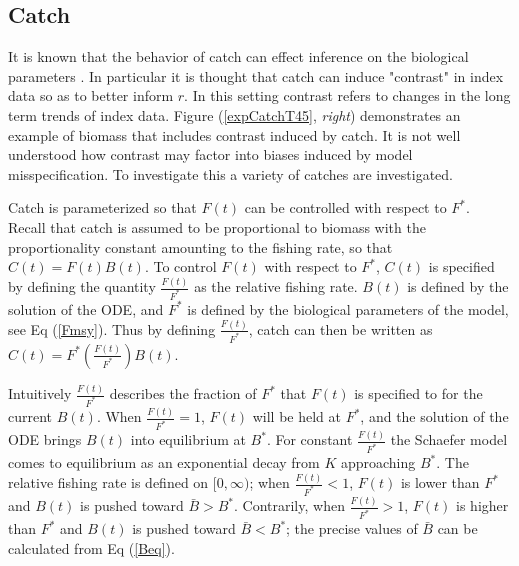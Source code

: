 \documentclass[12pt]{article}
\begin{document}
{%
\clearpage
\subsection{Catch \label{catch}}


%
It is known that the behavior of catch can effect inference on the biological 
parameters . %
In particular it is thought that catch can induce "contrast" in index data
so as to better inform $r$. In this setting contrast refers to changes in the 
long term trends of index data. Figure (\ref{expCatchT45}, \emph{right}) demonstrates an 
example of biomass that includes contrast induced by catch. It is not well 
understood how contrast may factor into biases induced by model misspecification. 
To investigate this a variety of catches are investigated.

%
Catch is parameterized so that $F(t)$ can be controlled with respect to $F^*$. 
Recall that catch is assumed to be proportional to biomass with the 
proportionality constant amounting to the fishing rate, so that $C(t)=F(t)B(t)$. 
To control $F(t)$ with respect to $F^*$, $C(t)$ is specified by defining the 
quantity $\frac{F(t)}{F^*}$ as the relative fishing rate. $B(t)$ is defined 
by the solution of the ODE, and $F^*$ is defined by the biological parameters 
of the model, see Eq (\ref{Fmsy}).  Thus by defining 
$\frac{F(t)}{F^*}$, catch can then be written as \mbox{$C(t)=F^*\left(\frac{F(t)}{F^*}\right)B(t)$.}

%
Intuitively $\frac{F(t)}{F^*}$ describes the fraction of $F^*$ that $F(t)$ is  
specified to for the current $B(t)$. When $\frac{F(t)}{F^*}=1$, $F(t)$ will be 
held at $F^*$, and the solution of the ODE brings $B(t)$ into equilibrium at 
$B^*$. For constant $\frac{F(t)}{F^*}$ the Schaefer model 
comes to equilibrium as an exponential decay from $K$ approaching $B^*$. The relative fishing rate is defined on $[0, \infty)$; when 
$\frac{F(t)}{F^*}<1$, $F(t)$ is lower than $F^*$ and $B(t)$ is pushed toward 
$\bar B>B^*$. Contrarily, when $\frac{F(t)}{F^*}>1$, $F(t)$ is higher than 
$F^*$ and $B(t)$ is pushed toward $\bar B<B^*$; the precise values of $\bar B$
can be calculated from Eq (\ref{Beq}).

}
\end{document}
